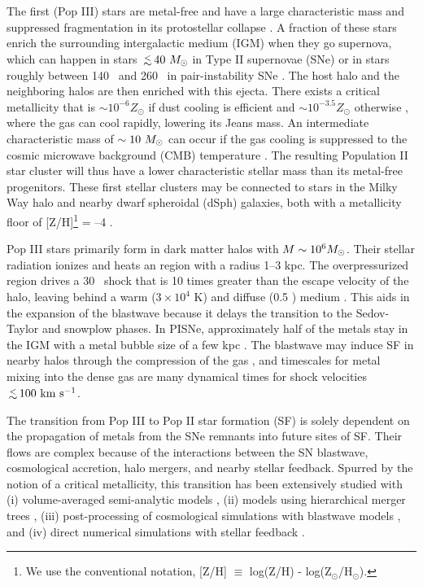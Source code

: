 \documentclass[apjl]{emulateapj}
\begin{document}
The first (Pop III) stars are metal-free and have a large
characteristic mass and suppressed fragmentation in its protostellar
collapse \citep{ABN02, Bromm02_P3, OShea07a}.  A fraction of these
stars enrich the surrounding intergalactic medium (IGM) when they go
supernova, which can happen in stars $\lsim 40~\Ms$ in Type II
supernovae (SNe) or in stars roughly between 140 \Ms~and 260 \Ms~in
pair-instability SNe \citep[PISNe;][]{2002ApJ...567..532H}.  The host
halo and the neighboring halos are then enriched with this ejecta.
There exists a critical metallicity that is $\sim 10^{-6} Z_\odot$ if
dust cooling is efficient \citep{Omukai05, Schneider06_Frag, clark08}
and $\sim 10^{-3.5} Z_\odot$ otherwise \citep{Bromm01,
  2009ApJ...691..441S}, where the gas can cool rapidly, lowering its
Jeans mass.  An intermediate characteristic mass of $\sim10~\Ms$ can
occur if the gas cooling is suppressed to the cosmic microwave
background (CMB) temperature \citep{Larson98, Tumlinson07_IMF,
  2009ApJ...691..441S}.  The resulting Population II star cluster will
thus have a lower characteristic stellar mass than its metal-free
progenitors.  These first stellar clusters may be connected to stars
in the Milky Way halo and nearby dwarf spheroidal (dSph) galaxies,
both with a metallicity floor of [Z/H]\footnote{We use the
  conventional notation, [Z/H] $\equiv$ log(Z/H) -
  log(Z$_\odot$/H$_\odot$).} = --4 \citep{Beers05, Frebel10_Obs,
  Tafelmeyer10}.

Pop III stars primarily form in dark matter halos with $M \sim 10^6
\Ms$.  Their stellar radiation ionizes and heats an  region
with a radius 1--3 kpc.  The overpressurized  region drives
a 30 \kms~shock that is 10 times greater than the escape velocity of
the halo, leaving behind a warm ($3 \times 10^4$ K) and diffuse (0.5
\cubecm) medium \citep{Kitayama04, Whalen04, Abel07}.  This aids in
the expansion of the blastwave because it delays the transition to the
Sedov-Taylor and snowplow phases.  In PISNe, approximately half of the
metals stay in the IGM with a metal bubble size of a few kpc
\citep{Wise08_Gal, Greif10}.  The blastwave may induce SF in nearby
halos through the compression of the gas \citep{Ferrara98}, and
timescales for metal mixing into the dense gas are many dynamical
times \citep{Cen08} for shock velocities $\lsim100~\kms$.

The transition from Pop III to Pop II star formation (SF) is solely
dependent on the propagation of metals from the SNe remnants into
future sites of SF.  Their flows are complex because of the
interactions between the SN blastwave, cosmological accretion, halo
mergers, and nearby stellar feedback.  Spurred by the notion of a
critical metallicity, this transition has been extensively studied
with (i) volume-averaged semi-analytic models \citep{Scannapieco03,
  Yoshida04, Furlanetto05_Reion}, (ii) models using hierarchical
merger trees \citep{Tumlinson06, Tumlinson10, Salvadori07, Komiya10},
(iii) post-processing of cosmological simulations with blastwave
models \citep{Karlsson08, Trenti09, Trenti10}, and (iv) direct
numerical simulations with stellar feedback \citep{Tornatore07,
  Ricotti08, Maio10_Pop32, Maio11_Enrich}.
\end{document}

